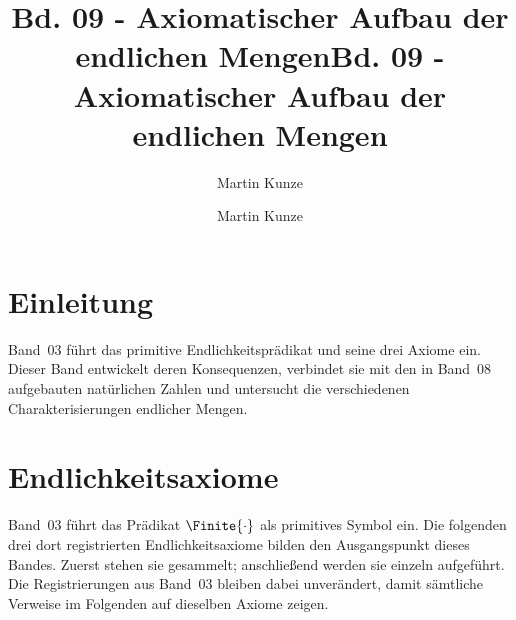\documentclass[main.tex]{subfiles}
\title{Bd. 09 - Axiomatischer Aufbau der endlichen Mengen}
\author{Martin Kunze}
\date{}
\begin{document}
\title{Bd. 09 - Axiomatischer Aufbau der endlichen Mengen}
\author{Martin Kunze}
\date{}
\hypersetup{pageanchor=false}
\maketitle
\hypersetup{pageanchor=true}
\setcounter{tocdepth}{3}
\tableofcontents
\setcounter{file}{9}
\renewcommand{\FormulaBandID}{9}

\chapter{Einleitung}

Band~03 führt das primitive Endlichkeitsprädikat und seine drei Axiome ein.
Dieser Band entwickelt deren Konsequenzen, verbindet sie mit den in Band~08
aufgebauten natürlichen Zahlen und untersucht die verschiedenen
Charakterisierungen endlicher Mengen.

\chapter{Endlichkeitsaxiome}

Band~03 führt das Prädikat \(\Finite{\cdot}\) als primitives Symbol ein.
Die folgenden drei dort registrierten Endlichkeitsaxiome bilden den
Ausgangspunkt dieses Bandes. Zuerst stehen sie gesammelt; anschließend
werden sie einzeln aufgeführt. Die Registrierungen aus Band~03 bleiben dabei
unverändert, damit sämtliche Verweise im Folgenden auf dieselben Axiome
zeigen.

\end{document}
